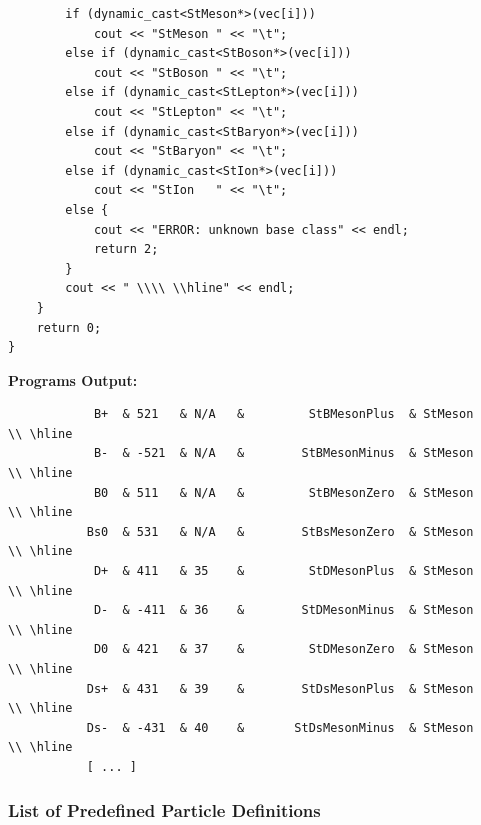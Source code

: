 \documentclass[twoside]{article}
\begin{document}
{\begin{verbatim}
        if (dynamic_cast<StMeson*>(vec[i]))
            cout << "StMeson " << "\t";
        else if (dynamic_cast<StBoson*>(vec[i]))
            cout << "StBoson " << "\t";
        else if (dynamic_cast<StLepton*>(vec[i]))
            cout << "StLepton" << "\t";
        else if (dynamic_cast<StBaryon*>(vec[i]))
            cout << "StBaryon" << "\t";
        else if (dynamic_cast<StIon*>(vec[i]))
            cout << "StIon   " << "\t";
        else {
            cout << "ERROR: unknown base class" << endl;
            return 2;
        }
        cout << " \\\\ \\hline" << endl;
    }    
    return 0;
}
\end{verbatim}
{\bf Programs Output:}
\begin{verbatim}
            B+  & 521   & N/A   &         StBMesonPlus  & StMeson        \\ \hline
            B-  & -521  & N/A   &        StBMesonMinus  & StMeson        \\ \hline
            B0  & 511   & N/A   &         StBMesonZero  & StMeson        \\ \hline
           Bs0  & 531   & N/A   &        StBsMesonZero  & StMeson        \\ \hline
            D+  & 411   & 35    &         StDMesonPlus  & StMeson        \\ \hline
            D-  & -411  & 36    &        StDMesonMinus  & StMeson        \\ \hline
            D0  & 421   & 37    &         StDMesonZero  & StMeson        \\ \hline
           Ds+  & 431   & 39    &        StDsMesonPlus  & StMeson        \\ \hline
           Ds-  & -431  & 40    &       StDsMesonMinus  & StMeson        \\ \hline
           [ ... ]
\end{verbatim}
}

\subsubsection{List of Predefined Particle Definitions}
\label{sec:predefpart}
\end{document}
